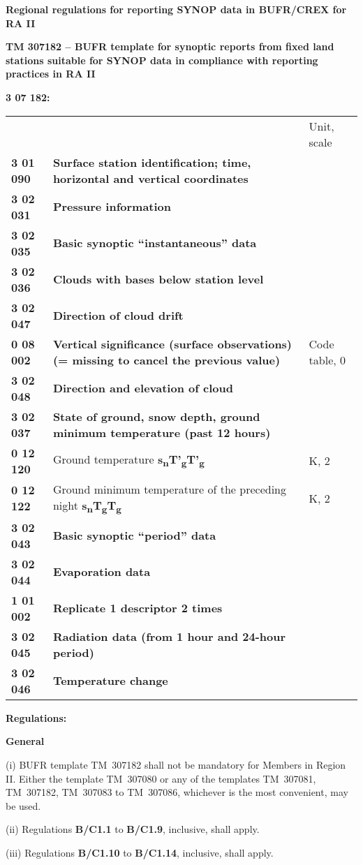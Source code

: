 \textbf{Regional regulations for reporting SYNOP data in BUFR/CREX for RA II}

\textbf{TM 307182 -- BUFR template for synoptic reports from fixed land stations suitable for SYNOP data in compliance with reporting practices in RA II}

\textbf{3 07 182:}

\begin{longtable}[]{@{}lll@{}}
\toprule
\endhead
& & Unit, scale\tabularnewline
\textbf{3 01 090} & \textbf{Surface station identification; time, horizontal and vertical coordinates} &\tabularnewline
\textbf{3 02 031} & \textbf{Pressure information} &\tabularnewline
\textbf{3 02 035} & \textbf{Basic synoptic ``instantaneous'' data} &\tabularnewline
\textbf{3 02 036} & \textbf{Clouds with bases below station level} &\tabularnewline
\textbf{3 02 047} & \textbf{Direction of cloud drift} &\tabularnewline
\textbf{0 08 002} & \textbf{Vertical significance (surface observations) (= missing to cancel the previous value)} & Code table, 0\tabularnewline
\textbf{3 02 048} & \textbf{Direction and elevation of cloud} &\tabularnewline
\textbf{3 02 037} & \textbf{State of ground, snow depth, ground minimum temperature (past 12 hours)} &\tabularnewline
\textbf{0 12 120} & Ground temperature \textbf{s\textsubscript{n}T'\textsubscript{g}T'\textsubscript{g}} & K, 2\tabularnewline
\textbf{0 12 122} & Ground minimum temperature of the preceding night \textbf{s\textsubscript{n}T\textsubscript{g}T\textsubscript{g}} & K, 2\tabularnewline
\textbf{3 02 043} & \textbf{Basic synoptic ``period'' data} &\tabularnewline
\textbf{3 02 044} & \textbf{Evaporation data} &\tabularnewline
\textbf{1 01 002} & \textbf{Replicate 1 descriptor 2 times} &\tabularnewline
\textbf{3 02 045} & \textbf{Radiation data (from 1 hour and 24-hour period)} &\tabularnewline
\textbf{3 02 046} & \textbf{Temperature change} &\tabularnewline
\bottomrule
\end{longtable}

\textbf{Regulations:}

\textbf{General}

(i) BUFR template TM~307182 shall not be mandatory for Members in Region II. Either the template TM~307080 or any of the templates TM~307081, TM~307182, TM~307083 to TM~307086, whichever is the most convenient, may be used.

(ii) Regulations \textbf{B/C1.1} to \textbf{B/C1.9}, inclusive, shall apply.

(iii) Regulations \textbf{B/C1.10} to \textbf{B/C1.14}, inclusive, shall apply.

